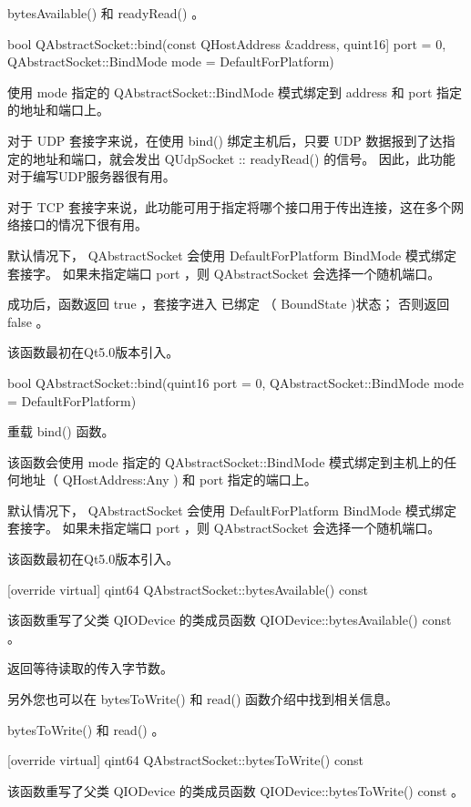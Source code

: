 \begin{notice}[另请查阅]
bytesAvailable() 和 readyRead() 。
\end{notice}


\splitLine

bool QAbstractSocket::bind(const QHostAddress \&address, quint16] port
= 0, QAbstractSocket::BindMode mode = DefaultForPlatform)

使用 mode 指定的 QAbstractSocket::BindMode 模式绑定到 address 和 port 指定的地址和端口上。

对于 UDP 套接字来说，在使用 bind() 绑定主机后，只要 UDP 数据报到了达指定的地址和端口，就会发出 QUdpSocket :: readyRead() 的信号。 因此，此功能对于编写UDP服务器很有用。

对于 TCP 套接字来说，此功能可用于指定将哪个接口用于传出连接，这在多个网络接口的情况下很有用。

默认情况下， QAbstractSocket 会使用 DefaultForPlatform BindMode 模式绑定套接字。 如果未指定端口 port ，则 QAbstractSocket 会选择一个随机端口。

成功后，函数返回 true ，套接字进入 已绑定 （ BoundState )状态； 否则返回 false 。

该函数最初在Qt5.0版本引入。

bool QAbstractSocket::bind(quint16 port = 0, QAbstractSocket::BindMode
mode = DefaultForPlatform)

重载 bind() 函数。

该函数会使用 mode 指定的 QAbstractSocket::BindMode 模式绑定到主机上的任何地址（ QHostAddress:Any ) 和 port 指定的端口上。

默认情况下， QAbstractSocket 会使用 DefaultForPlatform BindMode 模式绑定套接字。 如果未指定端口 port ，则 QAbstractSocket 会选择一个随机端口。

该函数最初在Qt5.0版本引入。

[override virtual] qint64 QAbstractSocket::bytesAvailable() const

该函数重写了父类 QIODevice 的类成员函数 QIODevice::bytesAvailable() const 。

返回等待读取的传入字节数。

另外您也可以在 bytesToWrite() 和 read() 函数介绍中找到相关信息。

\begin{notice}[另请查阅]
bytesToWrite() 和 read() 。
\end{notice}

[override virtual] qint64 QAbstractSocket::bytesToWrite() const

该函数重写了父类 QIODevice 的类成员函数 QIODevice::bytesToWrite() const 。

